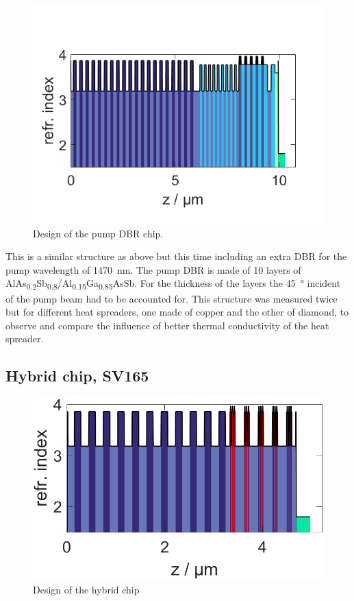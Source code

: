\begin{figure}
    \vspace{-\baselineskip}
    \centering
    \includegraphics[width=.98\textwidth]{images/1SV167.lay.png}
    \caption{Design of the pump DBR chip.}
    \label{fig:sv167}
\end{figure}

This is a similar structure as above but this time including an extra DBR for the pump wavelength of \qty{1470}{\nm}. The pump DBR is made of 10 layers of AlAs\textsubscript{0.2}Sb\textsubscript{0.8}/Al\textsubscript{0.15}Ga\textsubscript{0.85}AsSb. For the thickness of the layers the \qty{45}{\degree} incident of the pump beam had to be accounted for. This structure was measured twice but for different heat spreaders, one made of copper and the other of diamond, to observe and compare the influence of better thermal conductivity of the heat spreader.


\subsection*{Hybrid chip, SV165}

\begin{figure}
    \vspace{-\baselineskip}
    \centering
    \includegraphics[width=.98\textwidth]{images/1SV165.lay.png}
    \caption{Design of the hybrid chip}
    \label{fig:sv165}
\end{figure}

